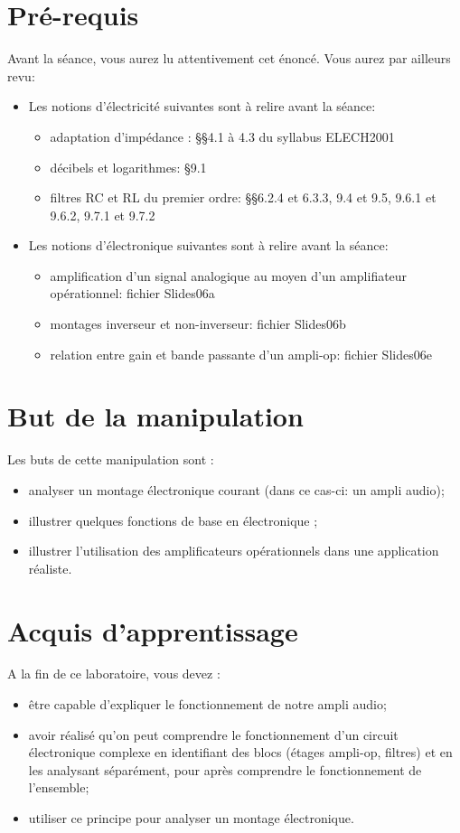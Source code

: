 \section*{Pré-requis}
Avant la séance, vous aurez lu attentivement cet énoncé. Vous aurez par ailleurs revu:\\
\begin{itemize}
\item Les notions d’électricité suivantes sont à relire avant la séance:
	\begin{itemize}
    \item adaptation d’impédance : §§4.1 à 4.3 du syllabus ELECH2001
	\item décibels et logarithmes: §9.1
	\item filtres RC et RL du premier ordre: §§6.2.4 et 6.3.3, 9.4 et 9.5, 9.6.1 et 9.6.2, 9.7.1 et 9.7.2
	\end{itemize}

\item Les notions d’électronique suivantes sont à relire avant la séance:
	\begin{itemize}
    \item amplification d’un signal analogique au moyen d’un amplifiateur opérationnel: fichier Slides06a
	\item montages inverseur et non-inverseur: fichier Slides06b
	\item relation entre gain et bande passante d’un ampli-op: fichier Slides06e
    \end{itemize}
\end{itemize}

\section*{But de la manipulation}
Les buts de cette manipulation sont :\\
\begin{itemize}
	\item analyser un montage électronique courant (dans ce cas-ci: un ampli audio);
	\item illustrer quelques fonctions de base en électronique ;
	\item illustrer l'utilisation des amplificateurs opérationnels dans une application réaliste.
\end{itemize}

\section*{Acquis d'apprentissage}
A la fin de ce laboratoire, vous devez :\\
\begin{itemize}
\item être capable d'expliquer le fonctionnement de notre ampli audio;
\item avoir réalisé qu'on peut comprendre le fonctionnement d'un circuit électronique complexe en identifiant des blocs (étages ampli-op, filtres) et en les analysant séparément, pour après comprendre le fonctionnement de l'ensemble;
\item utiliser ce principe pour analyser un montage électronique.
\end{itemize}
